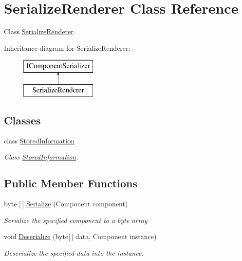 \hypertarget{class_serialize_renderer}{}\section{Serialize\+Renderer Class Reference}
\label{class_serialize_renderer}


Class \hyperlink{class_serialize_renderer}{Serialize\+Renderer}.  


Inheritance diagram for Serialize\+Renderer\+:\begin{figure}[H]
\begin{center}
\leavevmode
\includegraphics[height=2.000000cm]{class_serialize_renderer}
\end{center}
\end{figure}
\subsection*{Classes}
\begin{DoxyCompactItemize}
\item 
class \hyperlink{class_serialize_renderer_1_1_stored_information}{Stored\+Information}
\begin{DoxyCompactList}\small\item\em Class \hyperlink{class_serialize_renderer_1_1_stored_information}{Stored\+Information}. \end{DoxyCompactList}\end{DoxyCompactItemize}
\subsection*{Public Member Functions}
\begin{DoxyCompactItemize}
\item 
byte \mbox{[}$\,$\mbox{]} \hyperlink{class_serialize_renderer_afa879a8743291c478d35c50d9956c707}{Serialize} (Component component)
\begin{DoxyCompactList}\small\item\em Serialize the specified component to a byte array \end{DoxyCompactList}\item 
void \hyperlink{class_serialize_renderer_a98dc10a848db6d55165ce92ce5521c39}{Deserialize} (byte\mbox{[}$\,$\mbox{]} data, Component instance)
\begin{DoxyCompactList}\small\item\em Deserialize the specified data into the instance. \end{DoxyCompactList}\end{DoxyCompactItemize}
